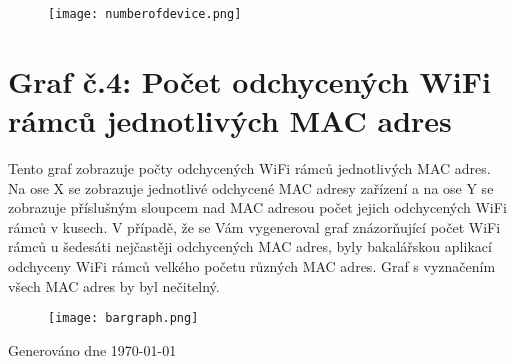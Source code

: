 \documentclass[11pt]{article}
\begin{document}
  \begin{figure}[!h]
    \texttt{[image: numberofdevice.png]}

  \end{figure}


  \newpage
  \section*{Graf č.4: Počet odchycených WiFi rámců jednotlivých MAC adres}
  Tento graf zobrazuje počty odchycených WiFi rámců jednotlivých MAC adres. Na ose X se zobrazuje jednotlivé odchycené MAC adresy zařízení a na ose Y se zobrazuje příslušným sloupcem nad MAC adresou počet jejich odchycených WiFi rámců v kusech. V případě, že se Vám vygeneroval graf znázorňující počet WiFi rámců u šedesáti nejčastěji odchycených MAC adres, byly bakalářskou aplikací odchyceny WiFi rámců velkého početu různých MAC adres. Graf s vyznačením všech MAC adres by byl nečitelný. 


  \begin{figure}[!h]
    \texttt{[image: bargraph.png]}

  \end{figure}
Generováno dne \today\
\end{document}
